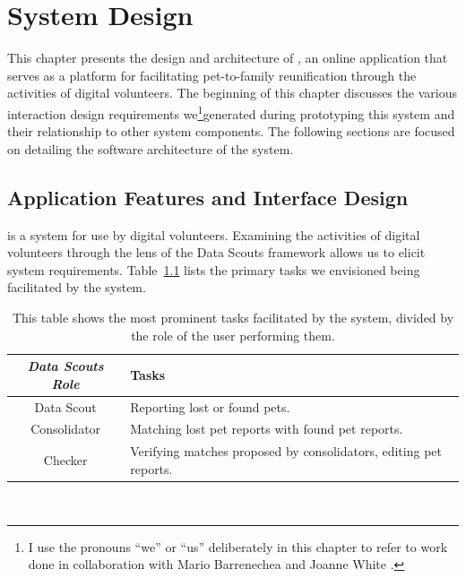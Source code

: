 \chapter{System Design}
\label{systemschapter}

This chapter presents the design and architecture of \nplh, an online application that serves as a platform for facilitating pet-to-family reunification through the activities of digital volunteers.  The beginning of this chapter discusses the various interaction design requirements we\footnote{I use the pronouns ``we'' or ``us'' deliberately in this chapter to refer to work done in collaboration with Mario Barrenechea and Joanne White \cite{sdc}.}generated during prototyping this system and their relationship to other system components.  The following sections are focused on detailing the software architecture of the system.

\section {Application Features and Interface Design}

\nplh{} is a system for use by digital volunteers.  Examining the activities of digital volunteers through the lens of the Data Scouts framework allows us to elicit system requirements.  Table~\ref{table:dsreqs} lists the primary tasks we envisioned being facilitated by the system.

\begin{table}[htb] 
    \caption[Tasks facilitated by the system]{
	This table shows the most prominent tasks facilitated by the system, divided by the role of the user performing them.
	}
    \begin{center}
    \begin{tabular}{||c|l||} \hline
	{\em Data Scouts Role} & Tasks \\  \hline \hline
	Data Scout  & Reporting lost or found pets. \\ \hline
	Consolidator & Matching lost pet reports with found pet reports. \\ \hline
	Checker & Verifying matches proposed by consolidators, editing pet reports. \\ \hline
	\end{tabular}
   \\ \rule{0mm}{5mm}
	\end{center}
	\label{table:dsreqs}
\end{table}

